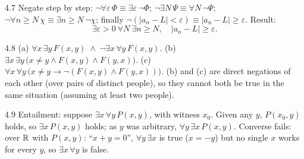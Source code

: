 \begin{solution}{4.7}
Negate step by step:
$\neg\forall\varepsilon\,\Phi \equiv \exists\varepsilon\,\neg\Phi$;
$\neg\exists N\,\Psi \equiv \forall N\,\neg\Psi$;
$\neg\forall n \geq N\,\chi \equiv \exists n \geq N\,\neg\chi$; finally
$\neg(|a_n - L| < \varepsilon) \equiv |a_n - L| \geq \varepsilon$. Result:
\[
\exists \varepsilon > 0\ \forall N\ \exists n \geq N,\quad
|a_n - L| \geq \varepsilon .
\]
\end{solution}

\begin{solution}{4.8}
(a) $\forall x\,\exists y\,F(x,y) \;\wedge\; \neg\exists x\,\forall y\,F(x,y)$.
(b) $\exists x\,\exists y\,\bigl(x \neq y \wedge F(x,y) \wedge F(y,x)\bigr)$.
(c) $\forall x\,\forall y\,\bigl(x\neq y \to \neg(F(x,y) \wedge F(y,x))\bigr)$.
(b) and (c) are direct negations of each other (over pairs of distinct
people), so they cannot both be true in the same situation (assuming at least
two people).
\end{solution}

\begin{solution}{4.9}
Entailment: suppose $\exists x\,\forall y\,P(x,y)$, with witness $x_0$. Given
any $y$, $P(x_0, y)$ holds, so $\exists x\,P(x,y)$ holds; as $y$ was
arbitrary, $\forall y\,\exists x\,P(x,y)$. Converse fails: over $\mathbb{R}$ with
$P(x,y)$: ``$x + y = 0$'', $\forall y\,\exists x$ is true ($x = -y$) but no
single $x$ works for every $y$, so $\exists x\,\forall y$ is false.
\end{solution}
